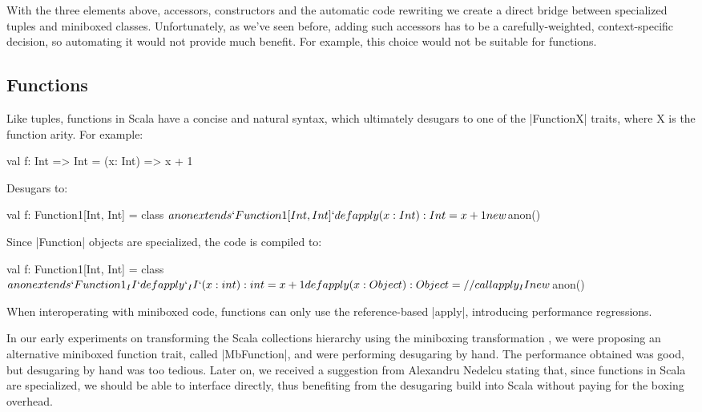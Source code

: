 With the three elements above, accessors, constructors and the automatic code rewriting we create a direct bridge between specialized tuples and miniboxed classes. Unfortunately, as we've seen before, adding such accessors has to be a carefully-weighted, context-specific decision, so automating it would not provide much benefit. For example, this choice would not be suitable for functions.

\subsection{Functions}
\label{sec:functions}

Like tuples, functions in Scala have a concise and natural syntax, which ultimately desugars to one of the |FunctionX| traits, where X is the function arity. For example:

\begin{lstlisting-nobreak}
 val f: Int => Int = (x: Int) => x + 1
\end{lstlisting-nobreak}

Desugars to:

\begin{lstlisting-nobreak}
 val f: Function1[Int, Int] = {
   class $anon extends `Function1[Int, Int]` {
     def apply(x: Int): Int = x + 1
   }
   new $anon()
 }
\end{lstlisting-nobreak}

Since |Function| objects are specialized, the code is compiled to:

\begin{lstlisting-nobreak}
 val f: Function1[Int, Int] = {
   class $anon extends `Function1_II` {
     def apply`_II`(x: int): int = x + 1
     def apply(x: Object): Object = // call apply_II
   }
   new $anon()
 }
\end{lstlisting-nobreak}

When interoperating with miniboxed code, functions can only use the reference-based |apply|, introducing performance regressions.

In our early experiments on transforming the Scala collections hierarchy using the miniboxing transformation \cite{miniboxing-linkedlist}, we were proposing an alternative miniboxed function trait, called |MbFunction|, and were performing desugaring by hand. The performance obtained was good, but desugaring by hand was too tedious. Later on, we received a suggestion from Alexandru Nedelcu stating that, since functions in Scala are specialized, we should be able to interface directly, thus benefiting from the desugaring build into Scala without paying for the boxing overhead.

